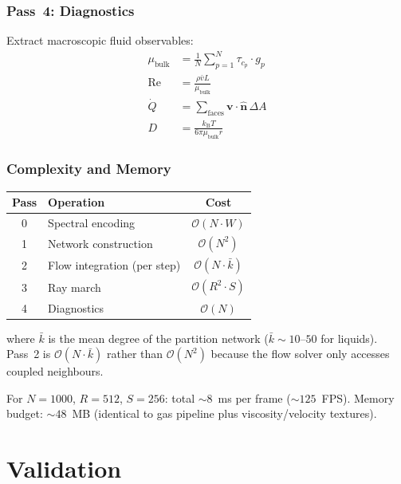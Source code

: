 \documentclass[twocolumn,10pt,a4paper]{article}
\theoremstyle{plain}
\theoremstyle{definition}
\theoremstyle{remark}
\newcommand{\kB}{k_{\mathrm{B}}}
\newcommand{\tauc}{\tau_c}
\newcommand{\BigO}{\mathcal{O}}
\begin{document}
\section{Pass~4: Diagnostics}
\label{sec:pass4}

Extract macroscopic fluid observables:
\begin{align}
    \mu_{\mathrm{bulk}} &= \frac{1}{N}\sum_{p=1}^{N} \tauc_p \cdot g_p \\
    \mathrm{Re} &= \frac{\rho \bar{v} L}{\mu_{\mathrm{bulk}}} \\
    \dot{Q} &= \sum_{\mathrm{faces}} \mathbf{v} \cdot \hat{\mathbf{n}}\, \Delta A \\
    D &= \frac{\kB T}{6\pi \mu_{\mathrm{bulk}} r}
\end{align}

\section{Complexity and Memory}
\label{sec:complexity}

\begin{center}
\begin{tabular}{clc}
\toprule
Pass & Operation & Cost \\
\midrule
0 & Spectral encoding & $\BigO(N \cdot W)$ \\
1 & Network construction & $\BigO(N^2)$ \\
2 & Flow integration (per step) & $\BigO(N \cdot \bar{k})$ \\
3 & Ray march & $\BigO(R^2 \cdot S)$ \\
4 & Diagnostics & $\BigO(N)$ \\
\bottomrule
\end{tabular}
\end{center}

where $\bar{k}$ is the mean degree of the partition network ($\bar{k} \sim 10$--$50$ for liquids). Pass~2 is $\BigO(N \cdot \bar{k})$ rather than $\BigO(N^2)$ because the flow solver only accesses coupled neighbours.

For $N = 1000$, $R = 512$, $S = 256$: total $\sim 8$~ms per frame ($\sim 125$~FPS). Memory budget: $\sim 48$~MB (identical to gas pipeline plus viscosity/velocity textures).


\part{Validation}
\label{part:validation}
\end{document}
